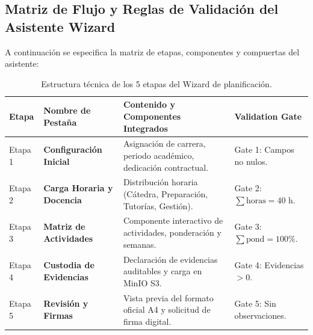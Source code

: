 \documentclass[12pt,a4paper]{article}
\begin{document}
\subsection{Matriz de Flujo y Reglas de Validación del Asistente Wizard}
A continuación se especifica la matriz de etapas, componentes y compuertas del asistente:
\begin{table}[H]
\centering
\small
\renewcommand{\arraystretch}{1.2}
\begin{tabularx}{\textwidth}{|>{\hsize=0.3\hsize\centering\arraybackslash\footnotesize}X|>{\hsize=1.0\hsize\raggedright\arraybackslash\bfseries\footnotesize}X|>{\hsize=2.2\hsize\raggedright\arraybackslash\footnotesize}X|>{\hsize=0.5\hsize\centering\arraybackslash\footnotesize}X|}
\hline
\rowcolor{tableheader}
\textbf{Etapa} & \textbf{Nombre de Pestaña} & \textbf{Contenido y Componentes Integrados} & \textbf{Validation Gate} \\
\hline
Etapa 1 & Configuración Inicial & Asignación de carrera, periodo académico, dedicación contractual. & Gate 1: Campos no nulos. \\
\hline
Etapa 2 & Carga Horaria y Docencia & Distribución horaria (Cátedra, Preparación, Tutorías, Gestión). & Gate 2: $\sum \text{horas} = 40\text{ h}$. \\
\hline
Etapa 3 & Matriz de Actividades & Componente interactivo de actividades, ponderación y semanas. & Gate 3: $\sum \text{pond} = 100\%$. \\
\hline
Etapa 4 & Custodia de Evidencias & Declaración de evidencias auditables y carga en MinIO S3. & Gate 4: Evidencias $>0$. \\
\hline
Etapa 5 & Revisión y Firmas & Vista previa del formato oficial A4 y solicitud de firma digital. & Gate 5: Sin observaciones. \\
\hline
\end{tabularx}
\caption{Estructura técnica de los 5 etapas del Wizard de planificación.}
\label{tab:wizard_matrix}
\end{table}
\end{document}
